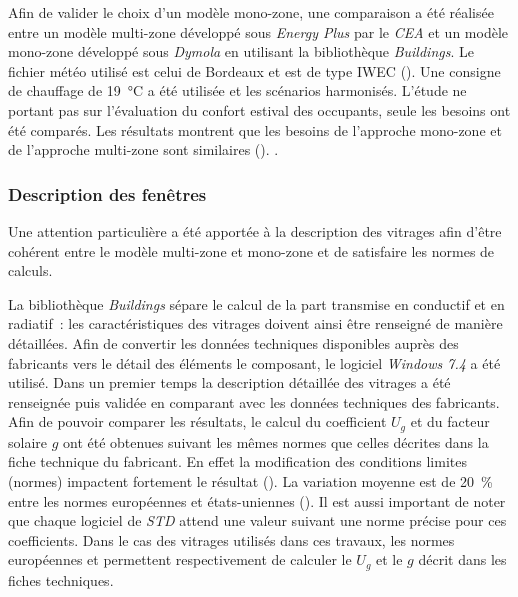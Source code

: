 Afin de valider le choix d’un modèle mono-zone, une comparaison a été réalisée
entre un modèle multi-zone développé sous \textit{Energy Plus} par le
\textit{CEA} et un modèle mono-zone développé sous \textit{Dymola} en utilisant
la bibliothèque \textit{Buildings}. Le fichier météo utilisé est celui de
Bordeaux et est de type IWEC (). Une
consigne de chauffage de \SI{19}{\celsius} a été utilisée et les scénarios
harmonisés. L’étude ne portant pas sur l’évaluation du confort estival des
occupants, seule les besoins ont été comparés. Les résultats montrent que les
besoins de l’approche mono-zone et de l’approche multi-zone sont similaires
().
.


\subsubsection{Description des fenêtres} %
\label{ssub:description_des_fenetres}
Une attention particulière a été apportée à la description des vitrages afin
d’être cohérent entre le modèle multi-zone et mono-zone et de satisfaire les normes
de calculs.

La bibliothèque \textit{Buildings} sépare le calcul de la part transmise en
conductif et en radiatif~: les caractéristiques des vitrages doivent ainsi être
renseigné de manière détaillées. Afin de convertir les données techniques
disponibles auprès des fabricants vers le détail des éléments le composant, le
logiciel \textit{Windows 7.4} a été utilisé. Dans un premier temps la
description détaillée des vitrages a été renseignée puis validée en comparant
avec les données techniques des fabricants. Afin de pouvoir comparer les
résultats, le calcul du coefficient $U_{g}$ et du facteur solaire $g$ ont été
obtenues suivant les mêmes normes que celles décrites dans la fiche technique du
fabricant. En effet la modification des conditions limites (normes) impactent
fortement le résultat (). La variation moyenne est de
\SI{20}{\percent} entre les normes européennes et états-uniennes (). Il est aussi important de noter que chaque logiciel de \emph{STD} attend
une valeur suivant une norme précise pour ces coefficients. Dans le cas des
vitrages utilisés dans ces travaux, les normes européennes
 et  permettent respectivement
de calculer le $U_{g}$ et le $g$ décrit dans les fiches techniques.

